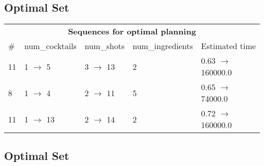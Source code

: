\documentclass{article}
\begin{document}
                            \subsection*{Optimal Set}

                            \begin{center}
                            \begin{tabular}{l|l|l|l|l}
                            \multicolumn{5}{c}{\bf \large Sequences for optimal planning}\\
                            \# & num\_cocktails & num\_shots & num\_ingredients & Estimated time\\\midrule
                            11&1 $\rightarrow$ 5&3 $\rightarrow$ 13&2&0.63 $\rightarrow$ 160000.0\\
8&1 $\rightarrow$ 4&2 $\rightarrow$ 11&5&0.65 $\rightarrow$ 74000.0\\
11&1 $\rightarrow$ 13&2 $\rightarrow$ 14&2&0.72 $\rightarrow$ 160000.0
                            \end{tabular}
                            \end{center}
                    
                                \subsection*{Optimal Set}
                                
\end{document}
